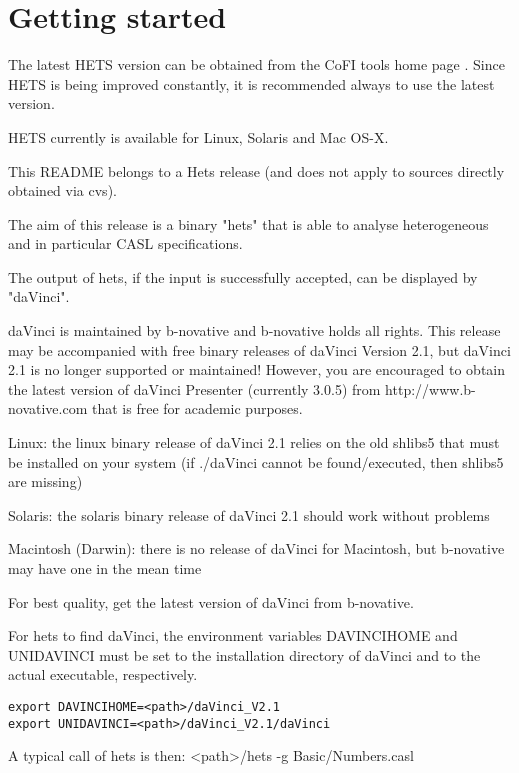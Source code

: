 \documentclass{article}
\newcommand{\normalTEXTSC}[2]{{#1\scriptsize#2}}
\newcommand     {\CoFI}{CoFI\xspace}
\newcommand     {\Hets}{\normalTEXTSC{H}{ETS}\xspace}
\begin{document}
\section{Getting started}
 
The latest \Hets version can be obtained from the
\CoFI tools home page \cite{CoFITools}. Since \Hets is being
improved constantly, it is recommended always to use the latest version.

\Hets currently is available for Linux, Solaris and
Mac OS-X.




This README belongs to a Hets release (and does not apply to
sources directly obtained via cvs).

The aim of this release is a binary "hets" that is able to analyse
heterogeneous and in particular CASL specifications.

The output of hets, if the input is successfully accepted, can be
displayed by "daVinci".

daVinci is maintained by b-novative and b-novative holds all rights.
This release may be accompanied with free binary releases of daVinci
Version 2.1, but daVinci 2.1 is no longer supported or maintained!
However, you are encouraged to obtain the latest version of daVinci
Presenter (currently 3.0.5) from http://www.b-novative.com that is
free for academic purposes.

Linux: the linux binary release of daVinci 2.1 relies on the old
shlibs5 that must be installed on your system (if ./daVinci cannot be
found/executed, then shlibs5 are missing)

Solaris: the solaris binary release of daVinci 2.1 should work without
problems

Macintosh (Darwin): there is no release of daVinci for Macintosh, but
b-novative may have one in the mean time

For best quality, get the latest version of daVinci from b-novative.

For hets to find daVinci, the environment variables DAVINCIHOME and
UNIDAVINCI must be set to the installation directory of daVinci and to
the actual executable, respectively.

\begin{verbatim}
export DAVINCIHOME=<path>/daVinci_V2.1
export UNIDAVINCI=<path>/daVinci_V2.1/daVinci
\end{verbatim}

A typical call of hets is then: <path>/hets -g Basic/Numbers.casl
\end{document}
